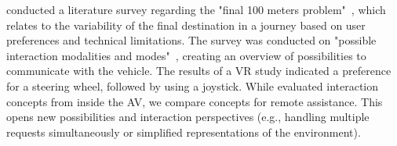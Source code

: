 \citet{colley_systematic_2022} conducted a literature survey regarding the "final 100 meters problem"~\cite{colley_systematic_2022}, which relates to the variability of the final destination in a journey based on user preferences and technical limitations. The survey was conducted on "possible interaction modalities and modes"~\cite[p. 2]{colley_systematic_2022}, creating an overview of possibilities to communicate with the vehicle. %
The results of a VR study indicated a preference for a steering wheel, followed by using a joystick. %
While \citet{colley_systematic_2022} evaluated interaction concepts from inside the AV, we compare concepts for remote assistance. This opens new possibilities and interaction perspectives (e.g., handling multiple requests simultaneously or simplified representations of the environment).




